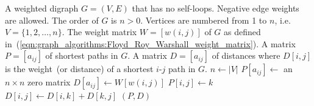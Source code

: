
\begin{algorithmic}[1]
\Require A weighted digraph $G = (V, E)$ that has no
  self-loops. Negative edge weights are allowed. The order of $G$ is
  $n > 0$. Vertices are numbered from 1 to $n$,
  i.e.~$V = \{1, 2, \dots, n\}$. The weight matrix $W = [w(i,j)]$ of
  $G$ as defined
  in~(\ref{eqn:graph_algorithms:Floyd_Roy_Warshall_weight_matrix}).
\Ensure A matrix $P = [a_{ij}]$ of shortest paths in $G$. A matrix
  $D = [a_{ij}]$ of distances where $D[i,j]$ is the weight~(or
  distance) of a shortest $i$-$j$ path in $G$.
\State $n \gets |V|$
\State $P[a_{ij}] \gets$ an $n \times n$ zero matrix
\State $D[a_{ij}] \gets W[w(i,j)]$
        \State $P[i,j] \gets k$
        \State $D[i,j] \gets D[i,k] + D[k,j]$
      \EndIf
    \EndFor
  \EndFor
\EndFor
\State \Return $(P,D)$
\end{algorithmic}
